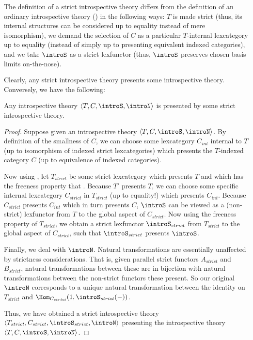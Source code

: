 The definition of a strict introspective theory differs from the definition of an ordinary introspective theory () in the following ways: $T$ is made strict (thus, its internal structures can be considered up to equality instead of mere isomorphism), we demand the selection of $C$ as a particular $T$-internal lexcategory up to equality (instead of simply up to presenting equivalent indexed categories), and we take $\introS$ as a strict lexfunctor (thus, $\introS$ preserves chosen basis limits on-the-nose).

Clearly, any strict introspective theory presents some introspective theory. Conversely, we have the following:

\begin{theorem}\label{StrictifyingIntrosp}
Any introspective theory $\langle T, C, \introS, \introN \rangle$ is presented by some strict introspective theory.
\end{theorem}
\begin{proof}
Suppose given an introspective theory $\langle T, C, \introS, \introN \rangle$. By definition of the smallness of $C$, we can choose some lexcategory $C_{int}$ internal to $T$ (up to isomorphism of indexed strict lexcategories) which presents the $T$-indexed category $C$ (up to equivalence of indexed categories).

Now using \TODO, let $T_{strict}$ be some strict lexcategory which presents $T$ and which has the freeness property that \TODO. Because $T'$ presents $T$, we can choose some specific internal lexcategory $C_{strict}$ in $T_{strict}$ (up to equality!) which presents $C_{int}$. Because $C_{strict}$ presents $C_{int}$ which in turn presents $C$, $\introS$ can be viewed as a (non-strict) lexfunctor from $T$ to the global aspect of $C_{strict}$. Now using the freeness property of $T_{strict}$, we obtain a strict lexfunctor $\introS_{strict}$ from $T_{strict}$ to the global aspect of $C_{strict}$, such that $\introS_{strict}$ presents $\introS$.

Finally, we deal with $\introN$. Natural transformations are essentially unaffected by strictness considerations. That is, given parallel strict functors $A_{strict}$ and $B_{strict}$, natural transformations between these are in bijection with natural transformations between the non-strict functors these present. So our original $\introN$ corresponds to a unique natural transformation between the identity on $T_{strict}$ and $\Hom_{C_{strict}}(1, \introS_{strict}(-))$.

Thus, we have obtained a strict introspective theory $\langle T_{strict}, C_{strict}, \introS_{strict}, \introN \rangle$ presenting the introspective theory $\langle T, C, \introS, \introN \rangle$.
\end{proof}

